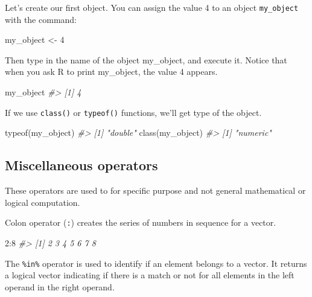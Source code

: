 \documentclass[
]{book}
\newenvironment{Shaded}{\begin{snugshade}}{\end{snugshade}}
\newcommand{\CommentTok}[1]{\textcolor[rgb]{0.56,0.35,0.01}{\textit{#1}}}
\newcommand{\DecValTok}[1]{\textcolor[rgb]{0.00,0.00,0.81}{#1}}
\newcommand{\FunctionTok}[1]{\textcolor[rgb]{0.00,0.00,0.00}{#1}}
\newcommand{\NormalTok}[1]{#1}
\newcommand{\OtherTok}[1]{\textcolor[rgb]{0.56,0.35,0.01}{#1}}
\newcommand{\SpecialCharTok}[1]{\textcolor[rgb]{0.00,0.00,0.00}{#1}}
\begin{document}
Let's create our first object. You can assign the value 4 to an object \texttt{my\_object} with the command:

\begin{Shaded}
\begin{Highlighting}[]
\NormalTok{my\_object }\OtherTok{\textless{}{-}} \DecValTok{4}
\end{Highlighting}
\end{Shaded}

Then type in the name of the object my\_object, and execute it. Notice that when you ask R to print my\_object, the value 4 appears.

\begin{Shaded}
\begin{Highlighting}[]
\NormalTok{my\_object}
\CommentTok{\#\textgreater{} [1] 4}
\end{Highlighting}
\end{Shaded}

If we use \texttt{class()} or \texttt{typeof()} functions, we'll get type of the object.

\begin{Shaded}
\begin{Highlighting}[]
\FunctionTok{typeof}\NormalTok{(my\_object)}
\CommentTok{\#\textgreater{} [1] "double"}
\FunctionTok{class}\NormalTok{(my\_object)}
\CommentTok{\#\textgreater{} [1] "numeric"}
\end{Highlighting}
\end{Shaded}

\hypertarget{miscellaneous-operators}{%
\subsection{Miscellaneous operators}\label{miscellaneous-operators}}

These operators are used to for specific purpose and not general mathematical or logical computation.

Colon operator (\texttt{:}) creates the series of numbers in sequence for a vector.

\begin{Shaded}
\begin{Highlighting}[]
\DecValTok{2}\SpecialCharTok{:}\DecValTok{8}
\CommentTok{\#\textgreater{} [1] 2 3 4 5 6 7 8}
\end{Highlighting}
\end{Shaded}

The \texttt{\%in\%} operator is used to identify if an element belongs to a vector. It returns a logical vector indicating if there is a match or not for all elements in the left operand in the right operand.
\end{document}
